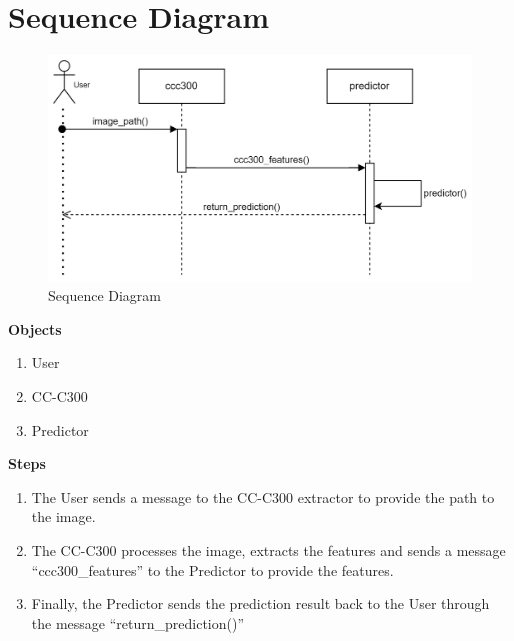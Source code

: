 \section{Sequence Diagram}
\begin{figure}[H]
    \centering
    \includegraphics[width=120mm]{./img/sequenceDiagram.png}
    \caption{Sequence Diagram}
\end{figure}
\large{\textbf{Objects}}
\normalsize{
\begin{enumerate}[noitemsep]
    \item User
    \item CC-C300
    \item Predictor
\end{enumerate}
}
\large{\textbf{Steps}}
\normalsize{
\begin{enumerate}[noitemsep]
    \item The User sends a message to the CC-C300 extractor to provide the path to the image.
    \item The CC-C300 processes the image, extracts the features and sends a message ``ccc300\_features'' to the Predictor to provide the features.
    \item Finally, the Predictor sends the prediction result back to the User through the message ``return\_prediction()''
\end{enumerate}
}

